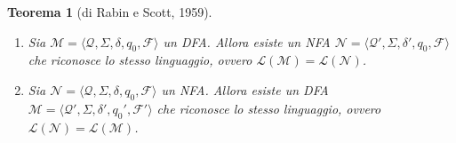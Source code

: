 \documentclass[a4paper, 11pt, oneside]{book}
\theoremstyle{formale}
\newtheorem{theorem}{Teorema}
\begin{document}
    \begin{theorem}[di Rabin e Scott, 1959]
        \label{thm:rabin-scott}
        \leavevmode
        \begin{enumerate}[label=\textup{(\alph*)}]
            \item Sia $\mathcal{M} = \langle \mathcal{Q}, \Sigma, \delta, q_0, \mathcal{F}
                \rangle$ un DFA. Allora esiste un NFA $\mathcal{N} = \langle \mathcal{Q}',
                \Sigma, \delta', q_0, \mathcal{F} \rangle$ che riconosce lo stesso
                linguaggio, ovvero $\mathcal{L}(\mathcal{M}) = \mathcal{L}(\mathcal{N})$.
            \item Sia $\mathcal{N} = \langle \mathcal{Q}, \Sigma, \delta, q_0, \mathcal{F}
                \rangle$ un NFA. Allora esiste un DFA $\mathcal{M} = \langle \mathcal{Q}',
                \Sigma, \delta', q_0', \mathcal{F}' \rangle$ che riconosce lo stesso
                linguaggio, ovvero $\mathcal{L}(\mathcal{N}) = \mathcal{L}(\mathcal{M})$.
        \end{enumerate}
    \end{theorem}
\end{document}

